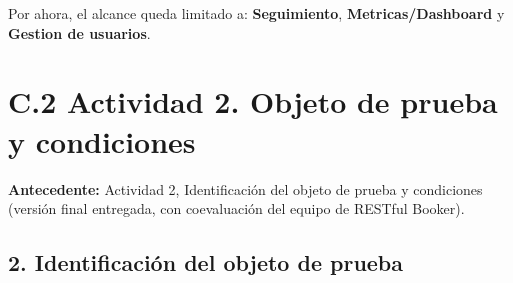 \documentclass[11pt,a4paper,oneside]{report}
\begin{document}
Por ahora, el alcance queda limitado a: \textbf{Seguimiento}, \textbf{Metricas/Dashboard} y \textbf{Gestion de usuarios}.


\section*{C.2 Actividad 2. Objeto de prueba y condiciones}

\begin{nota}
\textbf{Antecedente:} Actividad 2, Identificación del objeto de prueba y condiciones (versión final entregada, con coevaluación del equipo de RESTful Booker).

\end{nota}

\Needspace{150pt}\subsection*{2. Identificación del objeto de prueba}
\end{document}

